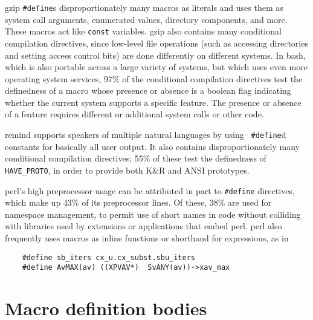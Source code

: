 \documentclass[10pt]{article}
\newcommand{\pkg}[1]{\textsf{#1}}
\begin{document}
\pkg{gzip} {\tt \#define}s disproportionately many macros as literals and
uses them as system call arguments, enumerated values, directory
components, and more.  These macros act like {\tt const} variables.
\pkg{gzip} also contains many conditional compilation directives, since
low-level file operations (such as accessing directories and setting access
control bits) are done differently on different systems.  In \pkg{bash},
which is also portable across a large variety of systems, but which
uses even more operating system services, 97\% of the conditional
compilation directives test the definedness of a macro whose presence or
absence is a boolean flag indicating whether the current system supports a
specific feature.  The presence or absence of a feature requires different
or additional system calls or other code.


\pkg{remind} supports speakers of multiple natural languages by using {\tt
\#define}d constants for basically all user output.  It also contains
disproportionately many conditional compilation directives; 55\% of
these test the definedness of \verb|HAVE_PROTO|, in order to provide both
K\&R and ANSI prototypes.


\pkg{perl}'s high preprocessor usage can be attributed in part to {\tt \#define}
directives, which make up 43\% of its preprocessor lines.  Of these, 38\%
are used for namespace management, to permit use of short names in code
without colliding with libraries used by extensions or applications that
embed \pkg{perl}.  \pkg{perl} also frequently uses macros as inline
functions or shorthand for expressions, as in
\begin{verbatim}
    #define sb_iters cx_u.cx_subst.sbu_iters
    #define AvMAX(av) ((XPVAV*)  SvANY(av))->xav_max
\end{verbatim}


\section{Macro definition bodies}
\label{sec:macro-bodies}

\end{document}
